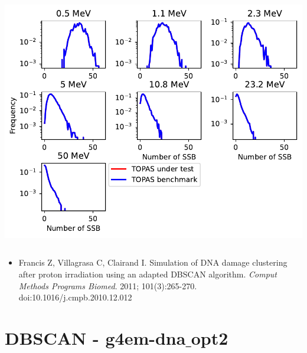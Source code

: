 \documentclass[aspectratio=1610]{beamer}
\begin{document}
\begin{frame}{\secname}
\begin{columns}
\begin{column}{0.6\linewidth}
   \includegraphics[width=\textwidth]{./DBSCAN/DBSCAN1_TsEmDNAPhysics}
  \end{column}
 \end{columns}
\begin{itemize}
\item \tiny{Francis Z, Villagrasa C, Clairand I. Simulation of DNA damage clustering after proton irradiation using an adapted DBSCAN algorithm. \textit{Comput Methods Programs Biomed}. 2011; 101(3):265-270. doi:10.1016/j.cmpb.2010.12.012}
\end{itemize}
\end{frame}

\section{DBSCAN - g4em-dna$\_$opt2}
\end{document}
